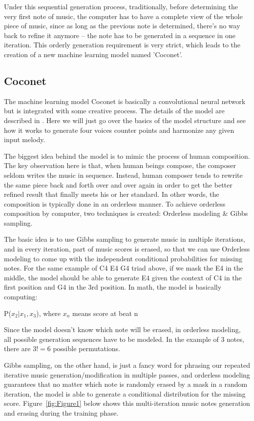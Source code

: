 \documentclass[jou]{apa6}
\begin{document}
Under this sequential generation process, traditionally, before determining the very first note of music, the computer has to have a complete view of the whole piece of music, since as long as the previous note is determined, there’s no way back to refine it anymore -- the note has to be generated in a sequence in one iteration. This orderly generation requirement is very strict, which leads to the creation of a new machine learning model named 'Coconet'.

\subsection{Coconet}

The machine learning model Coconet is basically a convolutional neural network but is integrated with some creative process. The details of the model are described in \textcite{huang2019counterpoint}. Here we will just go over the basics of the model structure and see how it works to generate four voices counter points and harmonize any given input melody.

The biggest idea behind the model is to mimic the process of human composition. The key observation here is that, when human beings compose, the composer seldom writes the music in sequence. Instead, human composer tends to rewrite the same piece back and forth over and over again in order to get the better refined result that finally meets his or her standard. In other words, the composition is typically done in an orderless manner. To achieve orderless composition by computer, two techniques is created: Orderless modeling & Gibbs sampling.

The basic idea is to use Gibbs sampling to generate music in multiple iterations, and in every iteration, part of music scores is erased, so that we can use Orderless modeling to come up with the independent conditional probabilities for missing notes. For the same example of C4 E4 G4 triad above, if we mask the E4 in the middle, the model should be able to generate E4 given the context of C4 in the first position and G4 in the 3rd position. In math, the model is basically computing: 

\centerline{P($x_2|x_1, x_3$), where $x_n$ means score at beat n}

Since the model doesn't know which note will be erased, in orderless modeling, all possible generation sequences have to be modeled. In the example of 3 notes, there are $3! = 6$ possible permutations.

Gibbs sampling, on the other hand, is just a fancy word for phrasing our repeated iterative music generation/modification in multiple passes, and orderless modeling guarantees that no matter which note is randomly erased by a mask in a random iteration, the model is able to generate a conditional distribution for the missing score. Figure~\ref{fig:Figure1} below shows this multi-iteration music notes generation and erasing during the training phase.
\end{document}
